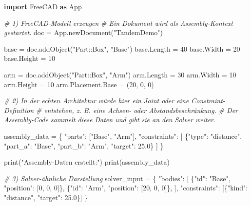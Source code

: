 \documentclass[
  12pt
]{book}
\newenvironment{Shaded}{}{}
\newcommand{\BuiltInTok}[1]{\textcolor[rgb]{0.00,0.50,0.00}{#1}}
\newcommand{\CommentTok}[1]{\textcolor[rgb]{0.38,0.63,0.69}{\textit{#1}}}
\newcommand{\DecValTok}[1]{\textcolor[rgb]{0.25,0.63,0.44}{#1}}
\newcommand{\FloatTok}[1]{\textcolor[rgb]{0.25,0.63,0.44}{#1}}
\newcommand{\ImportTok}[1]{\textcolor[rgb]{0.00,0.50,0.00}{\textbf{#1}}}
\newcommand{\NormalTok}[1]{#1}
\newcommand{\OperatorTok}[1]{\textcolor[rgb]{0.40,0.40,0.40}{#1}}
\newcommand{\StringTok}[1]{\textcolor[rgb]{0.25,0.44,0.63}{#1}}
\begin{document}
\begin{Shaded}
\begin{Highlighting}[]
\ImportTok{import}\NormalTok{ FreeCAD }\ImportTok{as}\NormalTok{ App}

\CommentTok{\# 1) FreeCAD{-}Modell erzeugen}
\CommentTok{\# Ein Dokument wird als Assembly{-}Kontext gestartet.}
\NormalTok{doc }\OperatorTok{=}\NormalTok{ App.newDocument(}\StringTok{"TandemDemo"}\NormalTok{)}

\NormalTok{base }\OperatorTok{=}\NormalTok{ doc.addObject(}\StringTok{"Part::Box"}\NormalTok{, }\StringTok{"Base"}\NormalTok{)}
\NormalTok{base.Length }\OperatorTok{=} \DecValTok{40}
\NormalTok{base.Width }\OperatorTok{=} \DecValTok{20}
\NormalTok{base.Height }\OperatorTok{=} \DecValTok{10}

\NormalTok{arm }\OperatorTok{=}\NormalTok{ doc.addObject(}\StringTok{"Part::Box"}\NormalTok{, }\StringTok{"Arm"}\NormalTok{)}
\NormalTok{arm.Length }\OperatorTok{=} \DecValTok{30}
\NormalTok{arm.Width }\OperatorTok{=} \DecValTok{10}
\NormalTok{arm.Height }\OperatorTok{=} \DecValTok{10}
\NormalTok{arm.Placement.Base }\OperatorTok{=}\NormalTok{ (}\DecValTok{20}\NormalTok{, }\DecValTok{0}\NormalTok{, }\DecValTok{0}\NormalTok{)}

\CommentTok{\# 2) In der echten Architektur würde hier ein Joint oder eine Constraint{-}Definition}
\CommentTok{\#    entstehen, z. B. eine Achsen{-} oder Abstandsbeschränkung.}
\CommentTok{\#    Der Assembly{-}Code sammelt diese Daten und gibt sie an den Solver weiter.}

\NormalTok{assembly\_data }\OperatorTok{=}\NormalTok{ \{}
    \StringTok{"parts"}\NormalTok{: [}\StringTok{"Base"}\NormalTok{, }\StringTok{"Arm"}\NormalTok{],}
    \StringTok{"constraints"}\NormalTok{: [}
\NormalTok{        \{}\StringTok{"type"}\NormalTok{: }\StringTok{"distance"}\NormalTok{, }\StringTok{"part\_a"}\NormalTok{: }\StringTok{"Base"}\NormalTok{, }\StringTok{"part\_b"}\NormalTok{: }\StringTok{"Arm"}\NormalTok{, }\StringTok{"target"}\NormalTok{: }\FloatTok{25.0}\NormalTok{\}}
\NormalTok{    ]}
\NormalTok{\}}

\BuiltInTok{print}\NormalTok{(}\StringTok{"Assembly{-}Daten erstellt:"}\NormalTok{)}
\BuiltInTok{print}\NormalTok{(assembly\_data)}

\CommentTok{\# 3) Solver{-}ähnliche Darstellung}
\NormalTok{solver\_input }\OperatorTok{=}\NormalTok{ \{}
    \StringTok{"bodies"}\NormalTok{: [}
\NormalTok{        \{}\StringTok{"id"}\NormalTok{: }\StringTok{"Base"}\NormalTok{, }\StringTok{"position"}\NormalTok{: [}\DecValTok{0}\NormalTok{, }\DecValTok{0}\NormalTok{, }\DecValTok{0}\NormalTok{]\},}
\NormalTok{        \{}\StringTok{"id"}\NormalTok{: }\StringTok{"Arm"}\NormalTok{, }\StringTok{"position"}\NormalTok{: [}\DecValTok{20}\NormalTok{, }\DecValTok{0}\NormalTok{, }\DecValTok{0}\NormalTok{]\},}
\NormalTok{    ],}
    \StringTok{"constraints"}\NormalTok{: [\{}\StringTok{"kind"}\NormalTok{: }\StringTok{"distance"}\NormalTok{, }\StringTok{"target"}\NormalTok{: }\FloatTok{25.0}\NormalTok{\}]}
\NormalTok{\}}


\end{Highlighting}
\end{Shaded}
\end{document}
